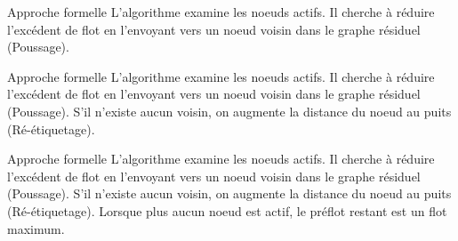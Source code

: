 \begin{frame}{Approche formelle}
	L'algorithme examine les noeuds actifs.\vfill
	Il cherche à réduire l'excédent de flot en l'envoyant vers un noeud voisin dans le graphe
	résiduel (Poussage).\vfill
\end{frame}

\begin{frame}{Approche formelle}
	L'algorithme examine les noeuds actifs.\vfill
	Il cherche à réduire l'excédent de flot en l'envoyant vers un noeud voisin dans le graphe
	résiduel (Poussage).\vfill
	S'il n'existe aucun voisin, on augmente la distance du noeud au puits (Ré-étiquetage).\vfill
\end{frame}

\begin{frame}{Approche formelle}
	L'algorithme examine les noeuds actifs.\vfill
	Il cherche à réduire l'excédent de flot en l'envoyant vers un noeud voisin dans le graphe
	résiduel (Poussage).\vfill
	S'il n'existe aucun voisin, on augmente la distance du noeud au puits (Ré-étiquetage).\vfill
	Lorsque plus aucun noeud est actif, le préflot restant est un flot maximum.\vfill
\end{frame}


